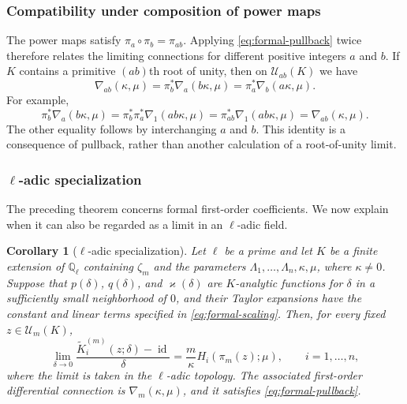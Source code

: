 \documentclass[12pt]{amsart}
\newtheorem{cor}[thm]{Corollary}
\theoremstyle{definition}
\numberwithin{equation}{section}
\theoremstyle{definition}
\let\mc\mathcal
\let\ka\kappa
\let\La\Lambda
\let\on\operatorname
\def\id{\on{id}}
\def\beq{\begin{equation}}
\def\eeq{\end{equation}}
\begin{document}
\subsubsection{Compatibility under composition of power maps}

The power maps satisfy $\pi_a\circ\pi_b=\pi_{ab}$.
Applying \eqref{eq:formal-pullback} twice therefore relates
the limiting connections for different positive integers
$a$ and $b$.  If $K$ contains a primitive $(ab)$th root of
unity, then on $\mc U_{ab}(K)$ we have
\beq\label{eq:formal-composition}
 \boxed{\quad
 \nabla_{ab}(\ka,\mu)
 =\pi_b^*\nabla_a(b\ka,\mu)
 =\pi_a^*\nabla_b(a\ka,\mu).
 \quad}
\eeq
For example,
\[
 \pi_b^*\nabla_a(b\ka,\mu)
 =\pi_b^*\pi_a^*\nabla_1(ab\ka,\mu)
 =\pi_{ab}^*\nabla_1(ab\ka,\mu)
 =\nabla_{ab}(\ka,\mu).
\]
The other equality follows by interchanging $a$ and $b$.
This identity is a consequence of pullback, rather than
another calculation of a root-of-unity limit.

\subsubsection{\texorpdfstring{$\ell$}{ell}-adic specialization}

The preceding theorem concerns formal first-order coefficients.
We now explain when it can also be regarded as a limit in an
$\ell$-adic field.

\begin{cor}[$\ell$-adic specialization]
\label{cor:ell-adic-limit}
Let $\ell$ be a prime and let $K$ be a finite extension
of $\mathbb Q_\ell$ containing $\zeta_m$ and the parameters
$\La_1,\ldots,\La_n,\ka,\mu$, where $\ka\ne0$.
Suppose that $p(\delta)$, $q(\delta)$, and
$\varkappa(\delta)$ are $K$-analytic functions for
$\delta$ in a sufficiently small neighborhood of $0$,
and their Taylor expansions have the constant and linear
terms specified in \eqref{eq:formal-scaling}.
Then, for every fixed $z\in\mc U_m(K)$,
\[
 \lim_{\delta\to0}
 \frac{\widetilde K_i^{(m)}(z;\delta)-\id}{\delta}
 =\frac{m}{\ka}H_i(\pi_m(z);\mu),
 \qquad i=1,\ldots,n,
\]
where the limit is taken in the $\ell$-adic topology.
The associated first-order differential connection is
$\nabla_m(\ka,\mu)$, and it satisfies
\eqref{eq:formal-pullback}.
\end{cor}
\end{document}
